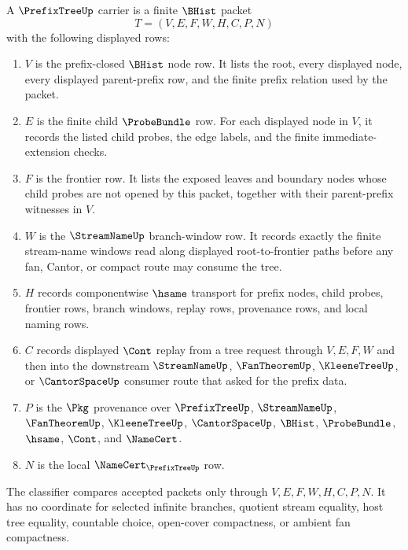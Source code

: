 \begin{definition}
\label{def:prefix-tree-frontier-carrier}
A $\PrefixTreeUp$ carrier is a finite $\BHist$ packet
$$
T=(V,E,F,W,H,C,P,N)
$$
with the following displayed rows:
\begin{enumerate}
\item $V$ is the prefix-closed $\BHist$ node row. It lists the root, every displayed node, every displayed parent-prefix row, and the finite prefix relation used by the packet.
\item $E$ is the finite child $\ProbeBundle$ row. For each displayed node in $V$, it records the listed child probes, the edge labels, and the finite immediate-extension checks.
\item $F$ is the frontier row. It lists the exposed leaves and boundary nodes whose child probes are not opened by this packet, together with their parent-prefix witnesses in $V$.
\item $W$ is the $\StreamNameUp$ branch-window row. It records exactly the finite stream-name windows read along displayed root-to-frontier paths before any fan, Cantor, or compact route may consume the tree.
\item $H$ records componentwise $\hsame$ transport for prefix nodes, child probes, frontier rows, branch windows, replay rows, provenance rows, and local naming rows.
\item $C$ records displayed $\Cont$ replay from a tree request through $V,E,F,W$ and then into the downstream $\StreamNameUp$, $\FanTheoremUp$, $\KleeneTreeUp$, or $\CantorSpaceUp$ consumer route that asked for the prefix data.
\item $P$ is the $\Pkg$ provenance over $\PrefixTreeUp$, $\StreamNameUp$, $\FanTheoremUp$, $\KleeneTreeUp$, $\CantorSpaceUp$, $\BHist$, $\ProbeBundle$, $\hsame$, $\Cont$, and $\NameCert$.
\item $N$ is the local $\NameCert_{\PrefixTreeUp}$ row.
\end{enumerate}
The classifier compares accepted packets only through $V,E,F,W,H,C,P,N$. It has no coordinate for selected infinite branches, quotient stream equality, host tree equality, countable choice, open-cover compactness, or ambient fan compactness.
\end{definition}

